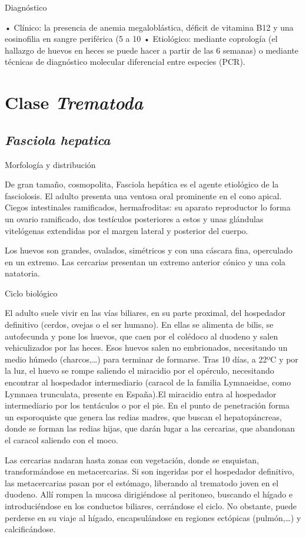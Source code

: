 Diagnóstico

• Clínico: la presencia de anemia megaloblástica, déficit de vitamina B12 y una eosinofilia en sangre periférica (5 a 10%
• Etiológico: mediante coprología (el hallazgo de huevos en heces se puede hacer a partir de las 6 semanas) o mediante técnicas de diagnóstico molecular diferencial entre especies (PCR).
\newpage
\section{Clase \textit{Trematoda}}
\subsection{\textit{Fasciola hepatica}}
Morfología y distribución

De gran tamaño, cosmopolita, Fasciola hepática es el agente etiológico de la fasciolosis. El adulto presenta una ventosa oral prominente en el cono apical. Ciegos intestinales ramificados, hermafroditas: su aparato reproductor lo forma un ovario ramificado, dos testículos posteriores a estos y unas glándulas vitelógenas extendidas por el margen lateral y posterior del cuerpo.

Los huevos son grandes, ovalados, simétricos y con una cáscara fina, operculado en un extremo. Las cercarias presentan un extremo anterior cónico y una cola natatoria.

Ciclo biológico

El adulto suele vivir en las vías biliares, en su parte proximal, del hospedador definitivo (cerdos, ovejas o el ser humano). En ellas se alimenta de bilis, se autofecunda y pone los huevos, que caen por el colédoco al duodeno y salen vehiculizados por las heces. Esos huevos salen no embrionados, necesitando un medio húmedo (charcos,…) para terminar de formarse. Tras 10 días, a 22ºC y por la luz, el huevo se rompe saliendo el miracidio por el opérculo, necesitando encontrar al hospedador intermediario (caracol de la familia Lymnaeidae, como Lymnaea trunculata, presente en España).El miracidio entra al hospedador intermediario por los tentáculos o por el pie. En el punto de penetración forma un esporoquiste que genera las redias madres, que buscan el hepatopáncreas, donde se forman las redias hijas, que darán lugar a las cercarias, que abandonan el caracol saliendo con el moco.

Las cercarias nadaran hasta zonas con vegetación, donde se enquistan, transformándose en metacercarias. Si son ingeridas por el hospedador definitivo, las metacercarias pasan por el estómago, liberando al trematodo joven en el duodeno. Allí rompen la mucosa dirigiéndose al peritoneo, buscando el hígado e introduciéndose en los conductos biliares, cerrándose el ciclo. No obstante, puede perderse en su viaje al hígado, encapsulándose en regiones ectópicas (pulmón,…) y calcificándose.

